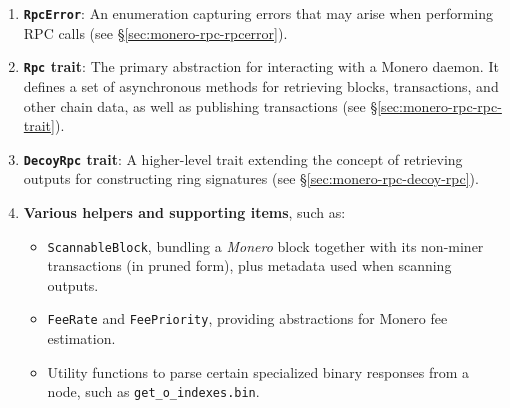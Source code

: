 \documentclass[12pt,a4paper]{article}
\begin{document}
\begin{enumerate}
    \item \textbf{\texttt{RpcError}}: An enumeration capturing errors that may
    arise when performing RPC calls (see
    \S\ref{sec:monero-rpc-rpcerror}). %

    \item \textbf{\texttt{Rpc} trait}: The primary abstraction for interacting
    with a Monero daemon.  It defines a set of asynchronous methods for
    retrieving blocks, transactions, and other chain data, as well as
    publishing transactions (see \S\ref{sec:monero-rpc-rpc-trait}). %

    \item \textbf{\texttt{DecoyRpc} trait}: A higher-level trait extending the
    concept of retrieving outputs for constructing ring signatures (see
    \S\ref{sec:monero-rpc-decoy-rpc}). %

    \item \textbf{Various helpers and supporting items}, such as:
    \begin{itemize}
      \item \texttt{ScannableBlock}, bundling a \emph{Monero} block together
      with its non-miner transactions (in pruned form), plus metadata used when
      scanning outputs. %
      \item \texttt{FeeRate} and \texttt{FeePriority}, providing abstractions
      for Monero fee estimation. %
      \item Utility functions to parse certain specialized binary responses from
      a node, such as \texttt{get\_o\_indexes.bin}. %
    \end{itemize}
\end{enumerate}
\end{document}
